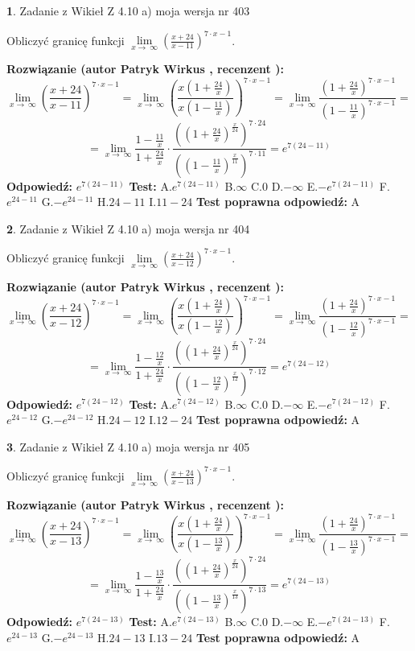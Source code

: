 \documentclass[12pt, a4paper]{article}
\theoremstyle{definition} %
\newtheorem{zad}{}
\newcommand{\zadStart}[1]{\begin{zad}#1\newline}
\newcommand{\zadStop}{\end{zad}}
\newcommand{\rozwStart}[2]{\noindent \textbf{Rozwiązanie (autor #1 , recenzent #2): }\newline}
\newcommand{\rozwStop}{\newline}
\newcommand{\odpStart}{\noindent \textbf{Odpowiedź:}\newline}
\newcommand{\odpStop}{\newline}
\newcommand{\testStart}{\noindent \textbf{Test:}\newline}
\newcommand{\testStop}{\newline}
\newcommand{\kluczStart}{\noindent \textbf{Test poprawna odpowiedź:}\newline}
\newcommand{\kluczStop}{\newline}
\begin{document}
\zadStart{Zadanie z Wikieł Z 4.10 a) moja wersja nr 403}


Obliczyć granicę funkcji  $\lim\limits_{x\to\ \infty}(\frac{x+24}{x-11})^{7\cdot x-1}$.
\zadStop
\rozwStart{Patryk Wirkus}{}
$$\lim\limits_{x\to\ \infty}(\frac{x+24}{x-11})^{7\cdot x-1} = \lim\limits_{x\to\ \infty}(\frac{x(1+\frac{24}{x})}{x(1-\frac{11}{x})})^{7\cdot x-1}=\lim\limits_{x\to\ \infty}\frac{(1+\frac{24}{x})^{7\cdot x-1}}{(1-\frac{11}{x})^{7\cdot x-1}}=$$
$$=\lim\limits_{x\to\ \infty}\frac{1-\frac{11}{x}}{1+\frac{24}{x}}\cdot\frac{((1+\frac{24}{x})^{\frac{x}{24}})^{7\cdot24}}{((1-\frac{11}{x})^{\frac{x}{11}})^{7\cdot11}}=e^{7(24-11)}$$
\rozwStop
\odpStart
$e^{7(24-11)}$
\odpStop
\testStart
A.$e^{7(24-11)}$ B.$\infty$ C.$0$ D.$-\infty$ E.$-e^{7(24-11)}$
F.$e^{24-11}$ G.$-e^{24-11}$
H.$24-11$
I.$11-24$
\testStop
\kluczStart
A
\kluczStop



\zadStart{Zadanie z Wikieł Z 4.10 a) moja wersja nr 404}


Obliczyć granicę funkcji  $\lim\limits_{x\to\ \infty}(\frac{x+24}{x-12})^{7\cdot x-1}$.
\zadStop
\rozwStart{Patryk Wirkus}{}
$$\lim\limits_{x\to\ \infty}(\frac{x+24}{x-12})^{7\cdot x-1} = \lim\limits_{x\to\ \infty}(\frac{x(1+\frac{24}{x})}{x(1-\frac{12}{x})})^{7\cdot x-1}=\lim\limits_{x\to\ \infty}\frac{(1+\frac{24}{x})^{7\cdot x-1}}{(1-\frac{12}{x})^{7\cdot x-1}}=$$
$$=\lim\limits_{x\to\ \infty}\frac{1-\frac{12}{x}}{1+\frac{24}{x}}\cdot\frac{((1+\frac{24}{x})^{\frac{x}{24}})^{7\cdot24}}{((1-\frac{12}{x})^{\frac{x}{12}})^{7\cdot12}}=e^{7(24-12)}$$
\rozwStop
\odpStart
$e^{7(24-12)}$
\odpStop
\testStart
A.$e^{7(24-12)}$ B.$\infty$ C.$0$ D.$-\infty$ E.$-e^{7(24-12)}$
F.$e^{24-12}$ G.$-e^{24-12}$
H.$24-12$
I.$12-24$
\testStop
\kluczStart
A
\kluczStop



\zadStart{Zadanie z Wikieł Z 4.10 a) moja wersja nr 405}


Obliczyć granicę funkcji  $\lim\limits_{x\to\ \infty}(\frac{x+24}{x-13})^{7\cdot x-1}$.
\zadStop
\rozwStart{Patryk Wirkus}{}
$$\lim\limits_{x\to\ \infty}(\frac{x+24}{x-13})^{7\cdot x-1} = \lim\limits_{x\to\ \infty}(\frac{x(1+\frac{24}{x})}{x(1-\frac{13}{x})})^{7\cdot x-1}=\lim\limits_{x\to\ \infty}\frac{(1+\frac{24}{x})^{7\cdot x-1}}{(1-\frac{13}{x})^{7\cdot x-1}}=$$
$$=\lim\limits_{x\to\ \infty}\frac{1-\frac{13}{x}}{1+\frac{24}{x}}\cdot\frac{((1+\frac{24}{x})^{\frac{x}{24}})^{7\cdot24}}{((1-\frac{13}{x})^{\frac{x}{13}})^{7\cdot13}}=e^{7(24-13)}$$
\rozwStop
\odpStart
$e^{7(24-13)}$
\odpStop
\testStart
A.$e^{7(24-13)}$ B.$\infty$ C.$0$ D.$-\infty$ E.$-e^{7(24-13)}$
F.$e^{24-13}$ G.$-e^{24-13}$
H.$24-13$
I.$13-24$
\testStop
\kluczStart
A
\kluczStop
\end{document}
